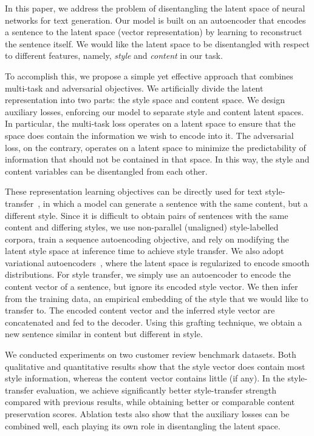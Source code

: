 \documentclass[letterpaper]{article} %
\begin{document}
In this paper, we address the problem of disentangling the latent space of neural networks for text generation.
Our model is built on an autoencoder that encodes a sentence to the latent space (vector representation) by learning to reconstruct the sentence itself.
We would like the latent space to be disentangled with respect to different features, namely, \textit{style} and \textit{content} in our task.

To accomplish this, we propose a simple yet effective approach that combines multi-task and adversarial objectives.
We artificially divide the latent representation into two parts: the style space and content space.
We design auxiliary losses, enforcing our model to separate style and content latent spaces.
In particular, the multi-task loss operates on a latent space to ensure that the space does contain the information we wish to encode into it.
The adversarial loss, on the contrary, operates on a latent space to minimize the predictability of information that should not be contained in that space.
In this way, the style and content variables can be disentangled from each other.

These representation learning objectives can be directly used for text style-transfer~\cite{hu2017toward,shen2017style,fu2017style}, in which a model can generate a sentence with the same content, but a different style.
Since it is difficult to obtain pairs of sentences with the same content and differing styles, we use non-parallel (unaligned) style-labelled corpora, train a sequence autoencoding objective, and rely on modifying the latent style space at inference time to achieve style transfer.
We also adopt variational autoencoders~\cite{kingma2013auto}, where the latent space is regularized to encode smooth distributions.
For style transfer, we simply use an autoencoder to encode the content vector of a sentence, but ignore its encoded style vector.
We then infer from the training data, an empirical embedding of the style that we would like to transfer to.
The encoded content vector and the inferred style vector are concatenated and fed to the decoder.
Using this grafting technique, we obtain a new sentence similar in content but different in style.

We conducted experiments on two customer review benchmark datasets.
Both qualitative and quantitative results show that the style vector does contain most style information, whereas the content vector contains little (if any).
In the style-transfer evaluation, we achieve significantly better style-transfer strength compared with previous results, while obtaining better or comparable content preservation scores.
Ablation tests also show that the auxiliary losses can be combined well, each playing its own role in disentangling the latent space.
\end{document}
